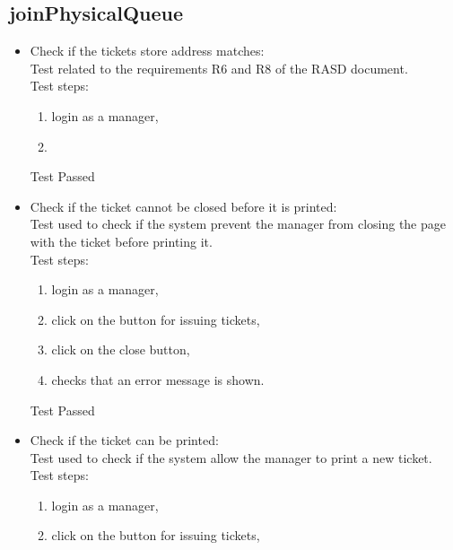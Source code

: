 \subsection{joinPhysicalQueue}

\begin{itemize}
    \item Check if the tickets store address matches: \\
    Test related to the requirements R6 and R8 of the RASD document. \\
    Test steps: \\
    \begin{enumerate}

        \item login as a manager,

        \item
    \end{enumerate}
    Test Passed

    \item Check if the ticket cannot be closed before it is printed: \\
    Test used to check if the system prevent the manager from closing the page with the ticket before printing it. \\
    Test steps: \\
    \begin{enumerate}
        \item login as a manager,

        \item click on the button for issuing tickets,

        \item click on the close button,

        \item checks that an error message is shown.
    \end{enumerate}
    Test Passed \\

    \item Check if the ticket can be printed: \\
    Test used to check if the system allow the manager to print a new ticket. \\
    Test steps:\\
    \begin{enumerate}
        \item login as a manager,

        \item click on the button for issuing tickets,


\end{enumerate}
\end{itemize}
